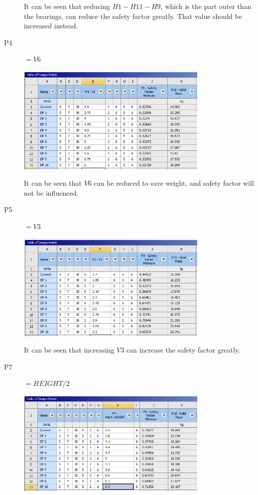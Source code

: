 \documentclass[a4paper,14pt]{extarticle}
\begin{document}
\begin{description}
It can be seen that reducing $H1 - H11 - H9$, which is the part outer than the bearings, can reduce the safety factor greatly. That value should be increased instead.
\item[P4] $=V6$

\includegraphics[width=0.75\textwidth]{singleParam/P4.PNG}

It can be seen that $V6$ can be reduced to save weight, and safety factor will not be influenced.
\item[P5] $=V3$

\includegraphics[width=0.75\textwidth]{singleParam/P5.PNG}

It can be seen that increasing $V3$ can increase the safety factor greatly.
\item[P7] $=HEIGHT / 2$

\includegraphics[width=0.75\textwidth]{singleParam/P7.PNG}


\end{description}
\end{document}
